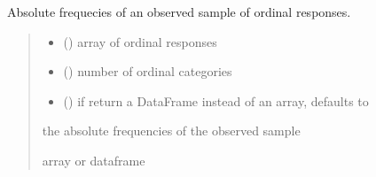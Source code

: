 \documentclass[letterpaper,10pt,english]{sphinxmanual}
\begin{document}
\begin{fulllineitems}
\label{\detokenize{cubmods:cubmods.general.freq}}
\pysigstartsignatures
{}
\pysigstopsignatures
\sphinxAtStartPar
Absolute frequecies of an
observed sample of ordinal
responses.
\begin{quote}\begin{description}
\begin{itemize}
\item {} 
\sphinxAtStartPar
{} () \textendash{} array of ordinal responses

\item {} 
\sphinxAtStartPar
{} () \textendash{} number of ordinal categories

\item {} 
\sphinxAtStartPar
{} () \textendash{} if  return
a DataFrame instead of an array,
defaults to 

\end{itemize}

\sphinxAtStartPar
the absolute frequencies of the observed sample

\sphinxAtStartPar
array or dataframe

\end{description}\end{quote}

\end{fulllineitems}

\end{document}
